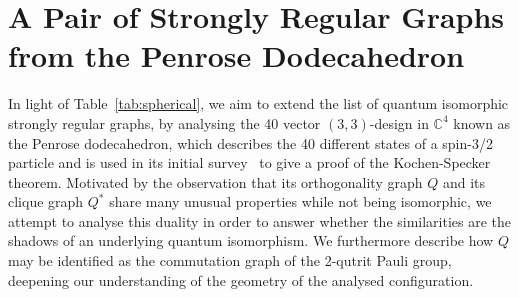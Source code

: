 \section{A Pair of Strongly Regular Graphs from the Penrose Dodecahedron}

In light of Table~\ref{tab:spherical}, we aim to extend the list of 
quantum isomorphic strongly regular graphs, by analysing the 
40 vector $(3, 3)$-design in $\mathbb{C}^4$ known as the 
Penrose dodecahedron, which describes the 40 different states
of a spin-3/2 particle and is used in its initial survey~\cite{ZIMBA1993697}
to give a proof of the Kochen-Specker theorem.
%
Motivated by the observation that its orthogonality graph $Q$ 
and its clique graph $Q^*$ share many unusual
properties while not being isomorphic,
we attempt to analyse this duality in order to answer
whether the similarities are the shadows of
an underlying quantum isomorphism.
%
We furthermore describe how $Q$ may be identified as the 
commutation graph of the 2-qutrit Pauli group,
deepening our understanding of the geometry of the 
analysed configuration.

